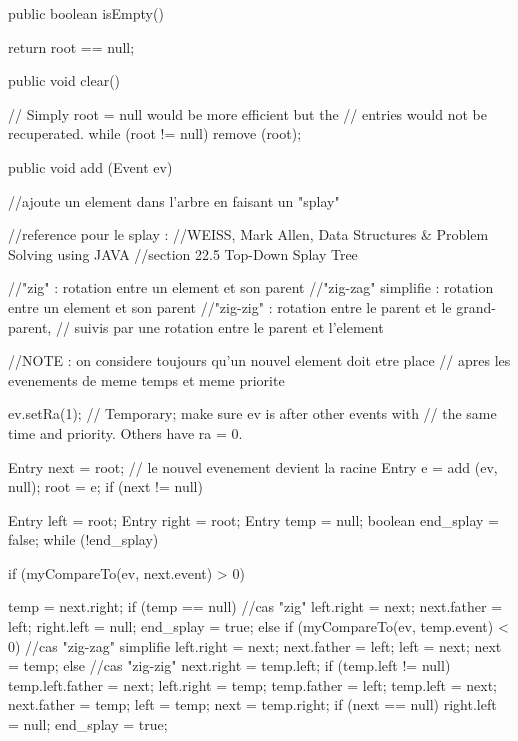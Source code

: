 \begin{hide}
\begin{code}
   public boolean isEmpty()\begin{hide} {
      return root == null;
   }\end{hide}

   public void clear()\begin{hide} {
      // Simply root = null would be more efficient but the
      // entries would not be recuperated.
      while (root != null)
         remove (root);
   }\end{hide}

   public void add (Event ev)\begin{hide} {
      //ajoute un element dans l'arbre en faisant un "splay"

      //reference pour le splay :
      //WEISS, Mark Allen, Data Structures & Problem Solving using JAVA
      //section 22.5 Top-Down Splay Tree

      //"zig" : rotation entre un element et son parent
      //"zig-zag" simplifie : rotation entre un element et son parent
      //"zig-zig" : rotation entre le parent et le grand-parent,
      //            suivis par une rotation entre le parent et l'element

      //NOTE : on considere toujours qu'un nouvel element doit etre place
      //       apres les evenements de meme temps et meme priorite

      ev.setRa(1);    // Temporary; make sure ev is after other events with
                      // the same time and priority. Others have ra = 0.

      Entry next = root;
      // le nouvel evenement devient la racine
      Entry e = add (ev, null);
      root = e;
      if (next != null) {
         Entry left = root;
         Entry right = root;
         Entry temp = null;
         boolean end_splay = false;
         while (!end_splay) {
            if (myCompareTo(ev, next.event) > 0) {
               temp = next.right;
               if (temp == null) {
                  //cas "zig"
                  left.right = next;
                  next.father = left;
                  right.left = null;
                  end_splay = true;
               }
               else if (myCompareTo(ev, temp.event) < 0) {
                  //cas "zig-zag" simplifie
                  left.right = next;
                  next.father = left;
                  left = next;
                  next = temp;
               }
               else {
                  //cas "zig-zig"
                  next.right = temp.left;
                  if (temp.left != null)
                     temp.left.father = next;
                  left.right = temp;
                  temp.father = left;
                  temp.left = next;
                  next.father = temp;
                  left = temp;
                  next = temp.right;
                  if (next == null) {
                     right.left = null;
                     end_splay = true;
                  }
               }

}}}}
\end{hide}
\end{code}
\end{hide}
